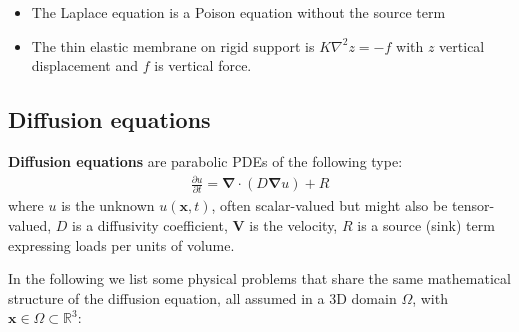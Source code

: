 \documentclass{digitaldynamics}
\def\vect#1{\bm{#1}}
\begin{document}
\begin{itemize}
	\item The Laplace equation is a Poison equation without the source term
	
	\item The thin elastic membrane on rigid support is $K \nabla^2 z = -f$ with $z$ vertical displacement and $f$ is vertical force.
\end{itemize}




\subsection{Diffusion equations}

\textbf{Diffusion equations} are parabolic PDEs of the following type:
\begin{align}
\frac{\partial u}{\partial t}  = \mathbf{\nabla} \cdot (D \mathbf{\nabla} u) + R
\label{eq:diffusion}
\end{align}
where $u$ is the unknown $u(\vect{x},t)$, often scalar-valued but might also be tensor-valued,
$D$ is a diffusivity coefficient, 
$\vect{V}$ is the velocity, 
$R$ is a source (sink) term expressing loads per units of volume.

In the following we list some physical problems that share the same mathematical structure of the diffusion equation, 
all assumed in a 3D domain $\Omega$, with $\vect{x} \in \Omega \subset \mathbb{R}^3$:
\end{document}
